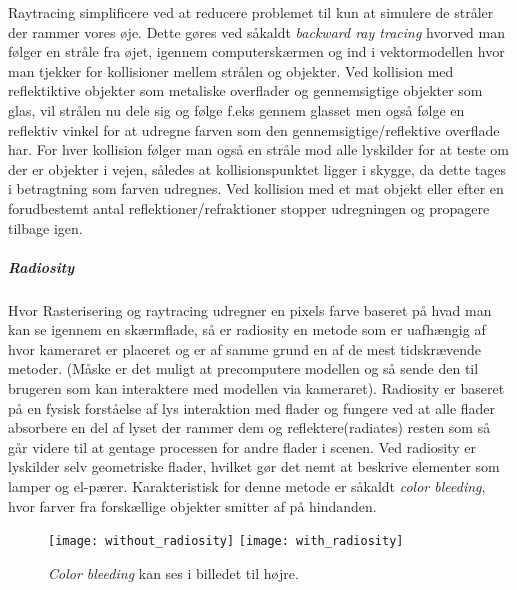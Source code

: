 \newline Raytracing simplificere ved at reducere problemet til kun at simulere de stråler der rammer vores øje. Dette gøres ved såkaldt \textit{backward ray tracing} hvorved man følger en stråle fra øjet, igennem computerskærmen og ind i vektormodellen hvor man tjekker for kollisioner mellem strålen og objekter. Ved kollision med reflektiktive objekter som metaliske overflader og gennemsigtige objekter som glas, vil strålen nu dele sig og følge f.eks gennem glasset men også følge en reflektiv vinkel for at udregne farven som den gennemsigtige/reflektive overflade har. For hver kollision følger man også en stråle mod alle lyskilder for at teste om der er objekter i vejen, således at kollisionspunktet ligger i skygge, da dette tages i betragtning som farven udregnes. Ved kollision med et mat objekt eller efter en forudbestemt antal reflektioner/refraktioner stopper udregningen og propagere tilbage igen.
\subparagraph{Radiosity}
Hvor Rasterisering og raytracing udregner en pixels farve baseret på hvad man kan se igennem en skærmflade, så er radiosity en metode som er uafhængig af hvor kameraret er placeret og er af samme grund en af de mest tidskrævende metoder. (Måske er det muligt at precomputere modellen og så sende den til brugeren som kan interaktere med modellen via kameraret). 
\newline Radiosity er baseret på en fysisk forståelse af lys interaktion med flader og fungere ved at alle flader absorbere en del af lyset der rammer dem og reflektere(radiates) resten som så går videre til at gentage processen for andre flader i scenen. Ved radiosity er lyskilder selv geometriske flader, hvilket gør det nemt at beskrive elementer som lamper og el-pærer. Karakteristisk for denne metode er såkaldt \textit{color bleeding}, hvor farver fra forskællige objekter smitter af på hindanden.
\begin{figure}[H]
    \centering
    \texttt{[image: without\_radiosity]}
    \texttt{[image: with\_radiosity]}
    \caption{\textit{Color bleeding} kan ses i billedet til højre.}
    \label{fig:colorbleeding}
\end{figure}
